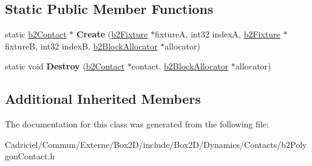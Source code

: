 \subsection*{Static Public Member Functions}
\begin{DoxyCompactItemize}
\item 
static \hyperlink{classb2_contact}{b2\+Contact} $\ast$ {\bfseries Create} (\hyperlink{classb2_fixture}{b2\+Fixture} $\ast$fixtureA, int32 indexA, \hyperlink{classb2_fixture}{b2\+Fixture} $\ast$fixtureB, int32 indexB, \hyperlink{classb2_block_allocator}{b2\+Block\+Allocator} $\ast$allocator)\hypertarget{classb2_polygon_contact_a6f72e00b9f4870b214477073be35f592}{}\label{classb2_polygon_contact_a6f72e00b9f4870b214477073be35f592}

\item 
static void {\bfseries Destroy} (\hyperlink{classb2_contact}{b2\+Contact} $\ast$contact, \hyperlink{classb2_block_allocator}{b2\+Block\+Allocator} $\ast$allocator)\hypertarget{classb2_polygon_contact_a8f9687ed70a02550095cf80d3bbefc92}{}\label{classb2_polygon_contact_a8f9687ed70a02550095cf80d3bbefc92}

\end{DoxyCompactItemize}
\subsection*{Additional Inherited Members}


The documentation for this class was generated from the following file\+:\begin{DoxyCompactItemize}
\item 
Cadriciel/\+Commun/\+Externe/\+Box2\+D/include/\+Box2\+D/\+Dynamics/\+Contacts/b2\+Polygon\+Contact.\+h\end{DoxyCompactItemize}
